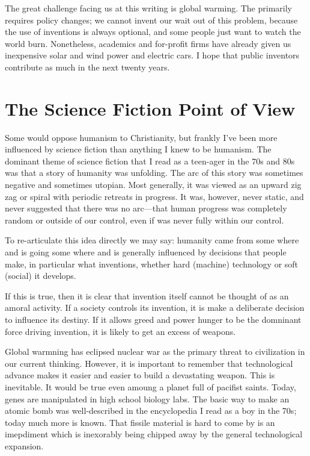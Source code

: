\documentclass[
	fontsize=10pt, %
	twoside=false, %
	secnumdepth=1, %
]{kaobook}
\begin{document}
The great challenge facing us at this writing is
global warming.
The primarily requires policy changes; we cannot
invent our wait out of this problem, because the
use of inventions is always optional, and some people
just want to watch the world burn.
Nonetheless, academics and for-profit firms have
already given us inexpensive solar and wind power and electric cars.
I hope that public inventors contribute as much in the next twenty years.

\chapter{The Science Fiction Point of View}

Some would oppose humanism to Christianity, but frankly I've
been more influenced by science fiction than anything I knew
to be humanism. The dominant theme of science fiction
that I read as a teen-ager in the 70s and 80s was that
a story of humanity was unfolding.
The arc of this story was sometimes negative and sometimes
utopian. Most generally, it was viewed as an upward
zig zag or spiral with periodic retreats in progress.
It was, however, never static, and never suggested that
there was no arc---that human progress was completely random
or outside of our control, even if was never fully within our
control.

To re-articulate this idea directly we may say:
humanity came from some where and is going some where and
is generally influenced by decisions that people make,
in particular what inventions, whether hard (machine)
technology or soft (social) it develops.

If this is true, then it is clear that invention itself
cannot be thought of as an amoral activity.
If a society controls its invention, it is make a deliberate
decision to influence its destiny.
If it allows greed and power hunger to be the domninant
force driving invention, it is likely to get an excess of
weapons.

Global warmning has eclipsed nuclear war as the primary
threat to civilization in our current thinking.
However, it is important to remember that technological
advance makes it easier and easier to build a devastating weapon.
This is inevitable. It would be true even amoung a planet
full of pacifist saints.
Today, genes are manipulated in high school biology labs.
The basic way to make an atomic bomb was well-described in
the encyclopedia I read as a boy in the 70s; today much
more is known. That fissile material is hard to come by
is an imepdiment which is inexorably being chipped away
by the general technological expansion.
\end{document}
